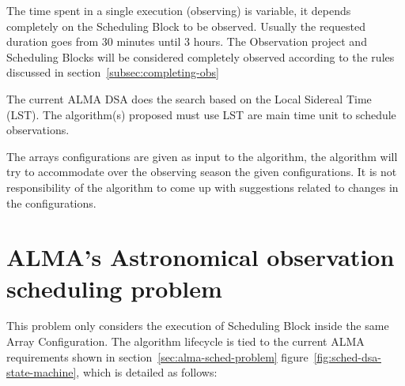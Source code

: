 The time spent in a single execution (observing) is variable, it depends completely on the Scheduling Block to be observed. Usually the requested duration goes from 30 minutes until 3 hours. The Observation project and Scheduling Blocks will be considered completely observed according to the rules discussed in section~\ref{subsec:completing-obs} 

The current ALMA DSA does the search based on the Local Sidereal Time (LST). The algorithm(s) proposed must use LST are main time unit to schedule observations.

The arrays configurations are given as input to the algorithm, the algorithm will try to accommodate over the observing season the given configurations. It is not responsibility of the algorithm to come up with suggestions related to changes in the configurations.
 
\section{ALMA's Astronomical observation scheduling problem}
\label{sec:astro-schedule-problem}
This problem only considers the execution of Scheduling Block inside the same Array Configuration. The algorithm lifecycle is tied to the current ALMA requirements shown in section~\ref{sec:alma-sched-problem} figure~\ref{fig:sched-dsa-state-machine}, which is detailed as follows:

